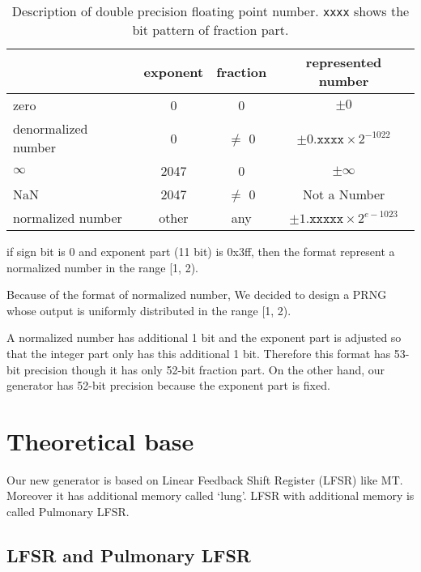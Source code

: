 \documentclass{svmult}
\begin{document}
\begin{table}[h]
  \begin{center}
    \begin{tabular}{|l|c|c|c|} \hline
      & exponent & fraction & represented number \\ \hline
      zero & 0 & 0 & $\pm 0$ \\ \hline
      denormalized number & 0 & $\neq$ 0 
      & $\pm 0.\texttt{xxxx} \times 2^{-1022}$ \\ 
      \hline
      $\infty$ & 2047 & 0 & $\pm\infty$ \\ \hline
      NaN & 2047 & $\neq$ 0 & Not a Number \\ \hline
      normalized number & 
      other & any & 
      $\pm 1.\texttt{xxxxx} \times 2^{e - 1023}$ \\ \hline
    \end{tabular}
    \caption{Description of double precision floating point
      number. \texttt{xxxx} shows the bit pattern of fraction part.}
    \label{tab:ieee}
  \end{center}
\end{table}
if sign bit is 0 and exponent part (11 bit) is 0x3ff,
then the format represent a normalized number in the range [1, 2).

Because of the format of normalized number, We decided to design a
PRNG whose output is uniformly distributed in the range [1, 2).
\begin{note}
  A normalized number has additional 1 bit and the exponent part is
  adjusted so that the integer part only has this additional 1 bit.
  Therefore this format has 53-bit precision though it has only 52-bit
  fraction part. On the other hand, our generator has 52-bit precision
  because the exponent part is fixed.
\end{note}
\section{Theoretical base}
\label{sec:base}

Our new generator is based on Linear Feedback Shift Register (LFSR)
like MT. Moreover it has additional memory called `lung'.  LFSR with
additional memory is called Pulmonary LFSR.

\subsection{LFSR and Pulmonary LFSR}
\label{sec:pulmonary}
\end{document}
